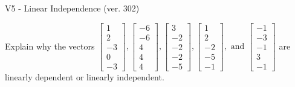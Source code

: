 \begin{exercise}
  \begin{exerciseTitle}V5 - Linear Independence (ver. 302)\end{exerciseTitle}
  \begin{exerciseStatement}
    Explain why the vectors \(\left[\begin{array}{r}
1 \\
2 \\
-3 \\
0 \\
-3
\end{array}\right] , \left[\begin{array}{r}
-6 \\
-6 \\
4 \\
4 \\
4
\end{array}\right] , \left[\begin{array}{r}
3 \\
-2 \\
-2 \\
-2 \\
-5
\end{array}\right] , \left[\begin{array}{r}
1 \\
2 \\
-2 \\
-5 \\
-1
\end{array}\right] , \text{ and } \left[\begin{array}{r}
-1 \\
-3 \\
-1 \\
3 \\
-1
\end{array}\right]\) are linearly dependent or linearly independent.	



\end{exerciseStatement}
\end{exercise}
